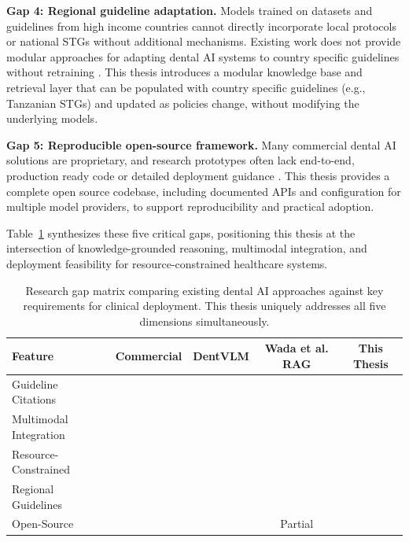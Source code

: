 \documentclass[12pt,a4paper]{report}
\newcommand{\cmark}{\ding{51}}
\newcommand{\xmark}{\ding{55}}
\begin{document}
	\textbf{Gap 4: Regional guideline adaptation.}
	Models trained on datasets and guidelines from high income countries cannot
	directly incorporate local protocols or national STGs without additional
	mechanisms. Existing work does not provide modular approaches for adapting
	dental AI systems to country specific guidelines without retraining
	\cite{inchingolo2025ai_dentistry_review,firoozi2025rag_dentistry}. This thesis
	introduces a modular knowledge base and retrieval layer that can be populated
	with country specific guidelines (e.g., Tanzanian STGs) and updated as policies
	change, without modifying the underlying models.
	
	\textbf{Gap 5: Reproducible open-source framework.}
	Many commercial dental AI solutions are proprietary, and research prototypes
	often lack end-to-end, production ready code or detailed deployment guidance
	\cite{inchingolo2025ai_dentistry_review,putra2021ai_dental_radiography}. This
	thesis provides a complete open source codebase, including documented APIs and
	configuration for multiple model providers, to support reproducibility and
	practical adoption.
	
	
	
	
	
	Table~\ref{tab:research_gap} synthesizes these five critical gaps, positioning this thesis at the intersection of knowledge-grounded reasoning, multimodal integration, and deployment feasibility for resource-constrained healthcare systems.
	
	\begin{table}[H]
		\centering
		\caption{Research gap matrix comparing existing dental AI approaches against key requirements for clinical deployment. This thesis uniquely addresses all five dimensions simultaneously.}
		\label{tab:research_gap}
		\begin{tabular}{@{}lcccc@{}}
			\toprule
			\textbf{Feature} & \textbf{Commercial} & \textbf{DentVLM} & \textbf{Wada et al. RAG} & \textbf{This Thesis} \\ 
			\midrule
			Guideline Citations & \xmark & \xmark & \cmark & \cmark \\
			Multimodal Integration & \xmark & \cmark & \xmark & \cmark \\
			Resource-Constrained & \xmark & \xmark & \xmark & \cmark \\
			Regional Guidelines & \xmark & \xmark & \xmark & \cmark \\
			Open-Source & \xmark & \xmark & Partial & \cmark \\
			\bottomrule
		\end{tabular}
	\end{table}
	
\end{document}
